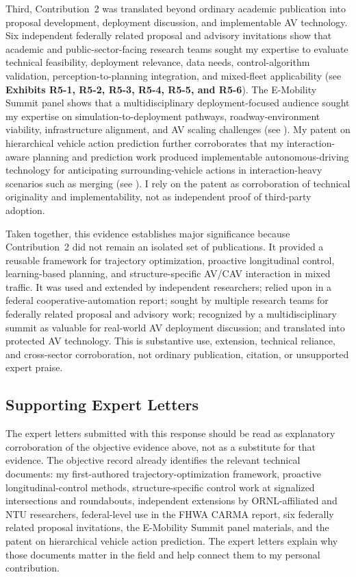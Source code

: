 \documentclass[11pt,letterpaper]{article}
\begin{document}
Third, Contribution~2 was translated beyond ordinary academic publication into proposal development, deployment discussion, and implementable AV technology. Six independent federally related proposal and advisory invitations show that academic and public-sector-facing research teams sought my expertise to evaluate technical feasibility, deployment relevance, data needs, control-algorithm validation, perception-to-planning integration, and mixed-fleet applicability (see \textbf{Exhibits R5-1, R5-2, R5-3, R5-4, R5-5, and R5-6}). The E-Mobility Summit panel shows that a multidisciplinary deployment-focused audience sought my expertise on simulation-to-deployment pathways, roadway-environment viability, infrastructure alignment, and AV scaling challenges (see ). My patent on hierarchical vehicle action prediction further corroborates that my interaction-aware planning and prediction work produced implementable autonomous-driving technology for anticipating surrounding-vehicle actions in interaction-heavy scenarios such as merging (see ). I rely on the patent as corroboration of technical originality and implementability, not as independent proof of third-party adoption.

Taken together, this evidence establishes major significance because Contribution~2 did not remain an isolated set of publications. It provided a reusable framework for trajectory optimization, proactive longitudinal control, learning-based planning, and structure-specific AV/CAV interaction in mixed traffic. It was used and extended by independent researchers; relied upon in a federal cooperative-automation report; sought by multiple research teams for federally related proposal and advisory work; recognized by a multidisciplinary summit as valuable for real-world AV deployment discussion; and translated into protected AV technology. This is substantive use, extension, technical reliance, and cross-sector corroboration, not ordinary publication, citation, or unsupported expert praise.

\subsection{Supporting Expert Letters}

The expert letters submitted with this response should be read as explanatory corroboration of the objective evidence above, not as a substitute for that evidence. The objective record already identifies the relevant technical documents: my first-authored trajectory-optimization framework, proactive longitudinal-control methods, structure-specific control work at signalized intersections and roundabouts, independent extensions by ORNL-affiliated and NTU researchers, federal-level use in the FHWA CARMA report, six federally related proposal invitations, the E-Mobility Summit panel materials, and the patent on hierarchical vehicle action prediction. The expert letters explain why those documents matter in the field and help connect them to my personal contribution.
\end{document}
